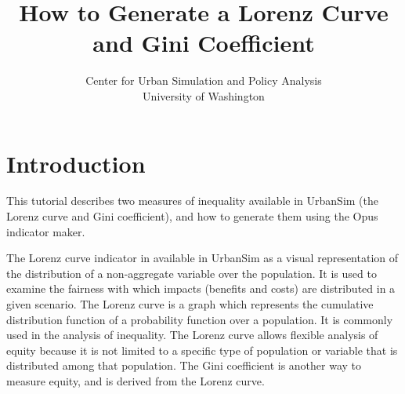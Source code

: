\documentclass{howto}
\begin{document}


\title{How to Generate a Lorenz Curve\\and Gini Coefficient}


\author{Center for Urban Simulation and Policy Analysis\\
University of Washington}



\maketitle

\section{Introduction}

This tutorial describes two measures of inequality available in UrbanSim
(the Lorenz curve and Gini coefficient), and how to generate them using the
Opus indicator maker.

The Lorenz curve indicator in available in UrbanSim as a visual
representation of the distribution of a non-aggregate variable over the
population.  It is used to examine the fairness with which impacts
(benefits and costs) are distributed in a given scenario.  The Lorenz curve
is a graph which represents the cumulative distribution function of a
probability function over a population.  It is commonly used in the
analysis of inequality.  The Lorenz curve allows flexible analysis of
equity because it is not limited to a specific type of population or
variable that is distributed among that population.  The Gini coefficient
is another way to measure equity, and is derived from the Lorenz curve.
 
\end{document}

